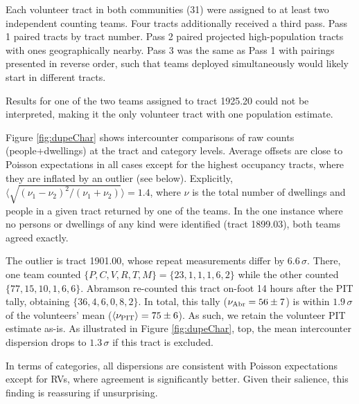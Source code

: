 \documentclass[11pt,twocolumn]{article}
\begin{document}
Each volunteer tract in both communities (31) were assigned to at least two independent counting teams.
Four tracts additionally received a third pass. Pass 1 paired tracts by tract number. Pass 2 paired projected 
high-population tracts with ones geographically nearby. Pass 3 was the same as Pass 1 with 
pairings presented in reverse order, such that teams deployed simultaneously would likely start in different 
tracts. 

Results for one of the two teams assigned to tract 1925.20 could not be interpreted, making it the only
volunteer tract with one population estimate.

Figure \ref{fig:dupeChar} shows intercounter comparisons of raw counts (people+dwellings)
at the tract and category levels. Average offsets are close to Poisson expectations in all cases 
except for the highest occupancy tracts, where they are inflated by an outlier (see below).
Explicitly, $\langle\sqrt{(\nu_{1}-\nu_{2})^{2}/(\nu_{1} + \nu_{2})}\rangle=1.4$, where
$\nu$ is the total number of dwellings and people in a given tract returned by one of the teams. 
In the one instance where no persons or dwellings of any kind were identified (tract 1899.03), 
both teams agreed exactly.

The outlier is tract 1901.00, whose repeat measurements differ by $6.6\,\sigma$. There, 
one team counted $\{P,C,V,R,T,M\}=\{23,1,1,1,6,2\}$ while the other counted $\{77,15,10,1,6,6\}$. 
Abramson re-counted this tract on-foot 14 hours after the PIT tally, obtaining $\{36, 4, 6, 0, 8, 2\}$.
In total, this tally ($\nu_{\rm Abr}=56\pm7$) is within $1.9\,\sigma$ of the volunteers' mean 
($\langle\nu_{\rm PIT}\rangle=75\pm6$). As such, we retain the volunteer PIT estimate as-is. As illustrated in 
Figure \ref{fig:dupeChar}, top, the mean intercounter dispersion drops to $1.3\,\sigma$ if this tract is 
excluded.

In terms of categories, all dispersions are consistent with Poisson expectations except for RVs, where 
agreement is significantly better. Given their salience, this finding is reassuring if unsurprising.

\end{document}
